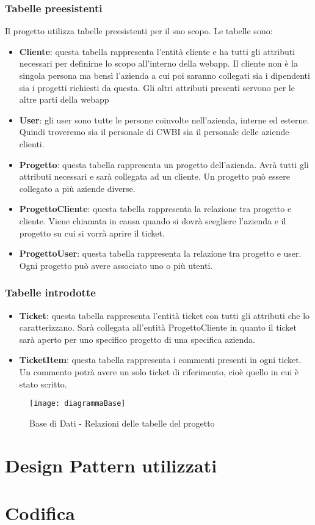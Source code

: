 \subsubsection*{Tabelle preesistenti}
Il progetto utilizza tabelle preesistenti per il suo scopo. Le tabelle sono: 
\begin{itemize}


    \item \textbf{Cliente}: questa tabella rappresenta l'entità cliente e ha tutti gli attributi necessari per definirne lo scopo all'interno della webapp. Il cliente non è la singola persona ma bensì l'azienda a cui poi saranno collegati sia i dipendenti sia i progetti richiesti da questa. Gli altri attributi presenti servono per le altre parti della webapp
    \item \textbf{User}: gli user sono tutte le persone coinvolte nell'azienda, interne ed esterne. Quindi troveremo sia il personale di CWBI sia il personale delle aziende clienti.
    \item \textbf{Progetto}: questa tabella rappresenta un progetto dell'azienda. Avrà tutti gli attributi necessari e sarà collegata ad un cliente. Un progetto può essere collegato a più aziende diverse.
    \item \textbf{ProgettoCliente}: questa tabella rappresenta la relazione tra progetto e cliente. Viene chiamata in causa quando si dovrà scegliere l'azienda e il progetto su cui si vorrà aprire il ticket.
        \item \textbf{ProgettoUser}: questa tabella rappresenta la relazione tra progetto e user. Ogni progetto può avere associato uno o più utenti.
\end{itemize}

\subsubsection*{Tabelle introdotte}
\begin{itemize}
	\item \textbf{Ticket}: questa tabella rappresenta l'entità ticket con tutti gli attributi che lo caratterizzano. Sarà collegata all'entità ProgettoCliente in quanto il ticket sarà aperto per uno specifico progetto di una specifica azienda.
	
	\item \textbf{TicketItem}: questa tabella rappresenta i commenti presenti in ogni ticket. Un commento potrà avere un solo ticket di riferimento, cioè quello in cui è stato scritto.
\end{itemize}


\begin{figure}[H]
\bigskip
\bigskip
\bigskip
\bigskip
    \centering 
    \texttt{[image: diagrammaBase]} 
    \bigskip
    \caption{Base di Dati - Relazioni delle tabelle del progetto}
\end{figure}

\newpage
\section{Design Pattern utilizzati}

\section{Codifica}
